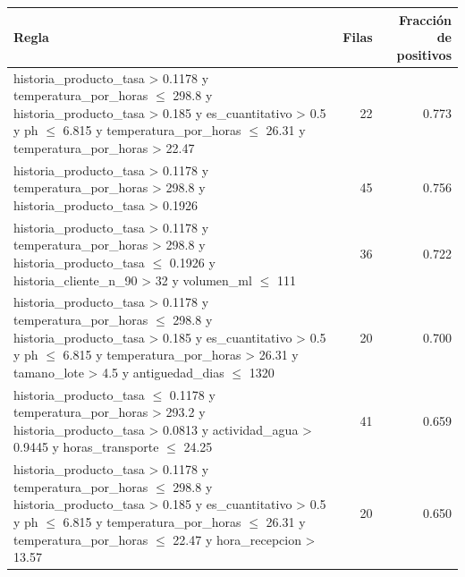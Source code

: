 \begin{tabular}{lrr}
\toprule
Regla & Filas & Fracción de positivos \\
\midrule
historia\_producto\_tasa > 0.1178 y temperatura\_por\_horas $\le$ 298.8 y historia\_producto\_tasa > 0.185 y es\_cuantitativo > 0.5 y ph $\le$ 6.815 y temperatura\_por\_horas $\le$ 26.31 y temperatura\_por\_horas > 22.47 & 22 & 0.773 \\
historia\_producto\_tasa > 0.1178 y temperatura\_por\_horas > 298.8 y historia\_producto\_tasa > 0.1926 & 45 & 0.756 \\
historia\_producto\_tasa > 0.1178 y temperatura\_por\_horas > 298.8 y historia\_producto\_tasa $\le$ 0.1926 y historia\_cliente\_n\_90 > 32 y volumen\_ml $\le$ 111 & 36 & 0.722 \\
historia\_producto\_tasa > 0.1178 y temperatura\_por\_horas $\le$ 298.8 y historia\_producto\_tasa > 0.185 y es\_cuantitativo > 0.5 y ph $\le$ 6.815 y temperatura\_por\_horas > 26.31 y tamano\_lote > 4.5 y antiguedad\_dias $\le$ 1320 & 20 & 0.700 \\
historia\_producto\_tasa $\le$ 0.1178 y temperatura\_por\_horas > 293.2 y historia\_producto\_tasa > 0.0813 y actividad\_agua > 0.9445 y horas\_transporte $\le$ 24.25 & 41 & 0.659 \\
historia\_producto\_tasa > 0.1178 y temperatura\_por\_horas $\le$ 298.8 y historia\_producto\_tasa > 0.185 y es\_cuantitativo > 0.5 y ph $\le$ 6.815 y temperatura\_por\_horas $\le$ 26.31 y temperatura\_por\_horas $\le$ 22.47 y hora\_recepcion > 13.57 & 20 & 0.650 \\
\bottomrule
\end{tabular}
